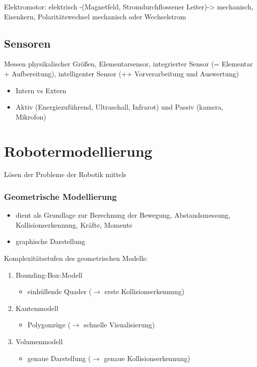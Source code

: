 Elektromotor: elektrisch -(Magnetfeld, Stromdurchflossener Leiter)-> mechanisch, Eisenkern, Polaritätswechsel mechanisch oder Wechselstrom

\subsection{Sensoren}

Messen physikalischer Größen, Elementarsensor, integrierter Sensor (= Elementar + Aufbereitung), intelligenter Sensor (++ Vorverarbeitung und Auswertung)

\begin{itemize}
	\item Intern vs Extern
	\item Aktiv (Energiezuführend, Ultraschall, Infrarot) und Passiv (kamera, Mikrofon)
\end{itemize}

\section{Robotermodellierung}

Lösen der Probleme der Robotik mittels


\subsubsection*{Geometrische Modellierung}

\begin{itemize}
\item dient als Grundlage zur Berechnung der Bewegung, Abstandsmessung, Kollisionserkennung, Kräfte, Momente
\item graphische Darstellung
\end{itemize}

Komplexitätsstufen des geometrischen Modells:
\begin{enumerate}
\item Bounding-Box-Modell
\begin{itemize}
\item einhüllende Quader ($\to$ erste Kollisionserkennung)
\end{itemize}
\item Kantenmodell
\begin{itemize}
\item Polygonzüge ($\to$ schnelle Visualisierung)
\end{itemize}
\item Volumenmodell
\begin{itemize}
\item genaue Darstellung ($\to$ genaue Kollisionserkennung)
\end{itemize}
\end{enumerate}

